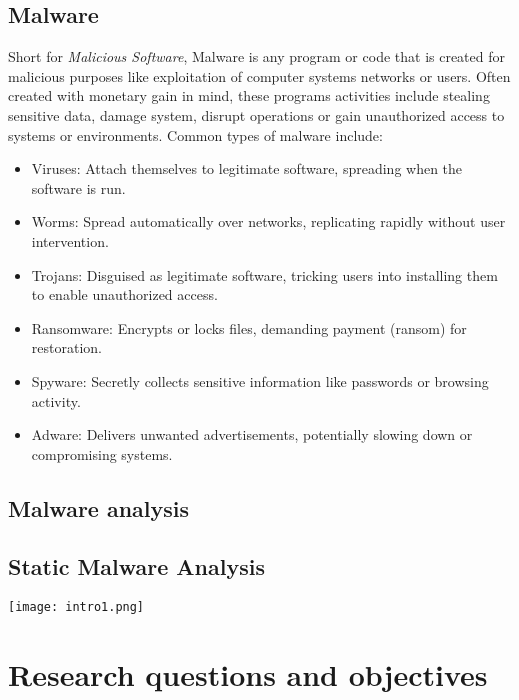 \subsection{Malware}
Short for \textit{Malicious Software}, Malware is any program or code that is created for malicious
purposes like exploitation of computer systems networks or users. Often created with monetary gain
in mind, these programs activities include stealing sensitive data, damage system, disrupt
operations or gain unauthorized access to systems or environments. Common types of malware include:
\begin{itemize}
	\item Viruses: Attach themselves to legitimate software, spreading when the software is run.
	\item Worms: Spread automatically over networks, replicating rapidly without user intervention.
	\item Trojans: Disguised as legitimate software, tricking users into installing them to enable
	      unauthorized access.
	\item Ransomware: Encrypts or locks files, demanding payment (ransom) for restoration.
	\item Spyware: Secretly collects sensitive information like passwords or browsing activity.
	\item Adware: Delivers unwanted advertisements, potentially slowing down or compromising systems.
\end{itemize}

\subsection{Malware analysis}

\subsection{Static Malware Analysis}

\vfill
\texttt{[image: intro1.png]}
\vfill

\section{Research questions and objectives}

